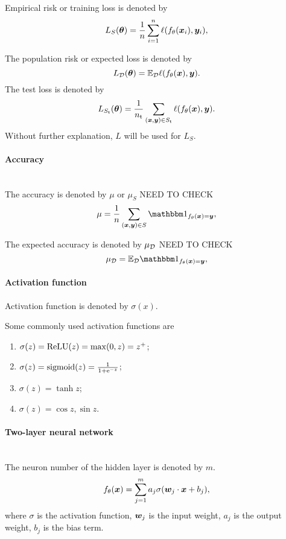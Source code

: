 \documentclass[]{report}
\begin{document}
Empirical risk or training loss is denoted by   
\begin{equation}
    L_S(\bm{\theta}) =\frac{1}{n}\sum_{i=1}^n\ell(f_{\theta}(\bm{x}_i),\bm{y}_i),
\end{equation}

The population risk or expected loss is denoted by
\begin{equation}
    L_{\mathcal{D}}(\bm{\theta}) =\mathbb{E}_{\mathcal{D}}\ell(f_{\theta}(\bm{x}),\bm{y}).
\end{equation}
The test loss is denoted by
\begin{equation}
    L_{S_{\rm t}}(\bm{\theta}) =\frac{1}{n_{\rm t}}\sum_{(\bm{x},\bm{y})\in S_{\rm t}}\ell(f_{\theta}(\bm{x}),\bm{y}).
\end{equation}
Without further explanation, $L$ will be used for $L_S$.

\paragraph{Accuracy}~\\
The accuracy is denoted by $\mu$ or $\mu_S$ NEED TO CHECK
\begin{equation}
    \mu =\frac{1}{n}\sum_{(\vx,\vy)\in S}\sone_{f_{\theta}(\vx)=\vy},
\end{equation}

The expected accuracy is denoted by $\mu_{\mathcal{D}}$  NEED TO CHECK
\begin{equation}
    \mu_{\fD} =\Exp_{\fD}\sone_{f_{\theta}(\vx)=\vy},
\end{equation}

\paragraph{Activation function}
Activation function is denoted by $\sigma(x)$. 
\begin{exam}Some commonly used activation functions are~\\
    \begin{enumerate}
        \item $\sigma(z) = \mathrm{ReLU} (z) = \max (0, z) = z^+$;
        \item $\sigma(z) ={\rm sigmoid}(z)= \frac{1}{1 + \mathrm{e}^{-z}}$;
        \item $\sigma(z) = \tanh z$;
        \item $\sigma(z) = \cos z, \sin z$.
    \end{enumerate}
\end{exam}


\paragraph{Two-layer neural network}~\\
The neuron number of the hidden layer is denoted by $m$.
\begin{equation}
    f_{\theta}(\bm{x})=\sum_{j=1}^{m} a_j \sigma (\bm{w}_j\cdot \bm{x} + b_j),
\end{equation}
where $\sigma$ is the activation function, $\bm{w}_j$ is the input weight, $a_j$ is the output weight, $b_j$ is the bias term.
\end{document}
